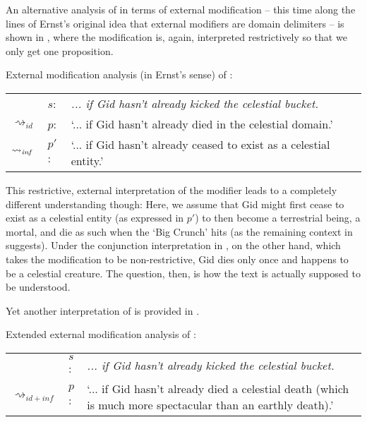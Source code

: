 \documentclass[output=paper]{langsci/langscibook}
\begin{document}
An alternative analysis of  in terms of external modification -- this time along the lines of Ernst's original idea that external modifiers are domain delimiters -- is shown in , where the modification is, again, interpreted restrictively so that we only get one proposition.

\ea \label{analysis2 celestial bucket} External modification analysis (in Ernst's sense) of :\smallskip\\
\begin{tabularx}{\linewidth}[t]{@{}llQ@{}}
& 	$s$: & \textit{... if Gid hasn't already kicked the celestial bucket.} \\
$\rightsquigarrow_{id}$ & $p$: & `... if Gid hasn't already died in the celestial domain.' \\
$\rightsquigarrow_{\text{\itshape inf}}$ & $p'$: & `... if Gid hasn't already ceased to exist as a celestial entity.' \\
\end{tabularx}
\z

\noindent This restrictive, external interpretation of the modifier leads to a completely different understanding though: Here, we assume that Gid might first cease to exist as a celestial entity (as expressed in $p'$) to then become a terrestrial being, a mortal, and die as such when the `Big Crunch' hits (as the remaining context in  suggests). Under the conjunction interpretation in , on the other hand, which takes the modification to be non-restrictive, Gid dies only once and happens to be a celestial creature. The question, then, is how the text is actually supposed to be understood. 

Yet another interpretation of  is provided in .

\ea \label{analysis3 celestial bucket} Extended external modification analysis of :\smallskip\\
\begin{tabularx}{\linewidth}[t]{@{}llQ@{}}
& 	$s$: & \textit{... if Gid hasn't already kicked the celestial bucket.} \\
$\rightsquigarrow_{id+in f}$	&	$p$:  & `... if Gid hasn't already died a celestial death (which is much more spectacular than an earthly death).'\\
\end{tabularx}
\z
\end{document}
